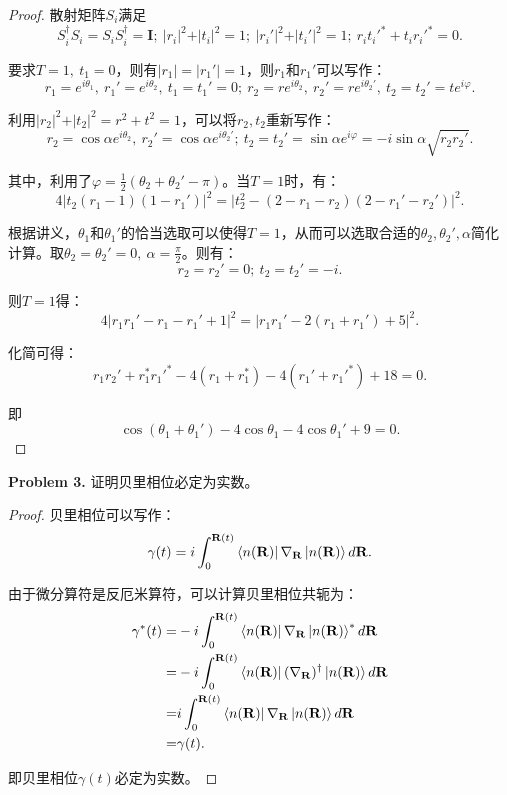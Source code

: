 \documentclass[reqno,a4paper,12pt]{amsart}
\begin{document}
\begin{proof}
散射矩阵$S_i$满足
\[
	S_i^\dagger S_i = S_i S_i^\dagger = \mathbf{I}; \ \vert r_i \vert^2 + \vert t_i \vert^2 = 1; \ \vert r_i' \vert^2 + \vert t_i' \vert^2 = 1; \ r_it_i'^* + t_ir_i'^* = 0.
\]

要求$T=1, \ t_1=0$，则有$\vert r_1 \vert = \vert r_1' \vert = 1$，则$r_1$和$r_1'$可以写作：
\[
	r_1 = e^{i\theta_1}, \ r_1' = e^{i\theta_2}, \ t_1 = t_1' = 0; \ r_2 = r e^{i\theta_2}, \ r_2' = r e^{i\theta_2'}, \ t_2 = t_2' = t e^{i\varphi}.
\]

利用$\vert r_2 \vert^2 + \vert t_2 \vert^2 = r^2 + t^2 = 1$，可以将$r_2, t_2$重新写作：
\[
	r_2 = \cos\alpha e^{i\theta_2}, \ r_2' = \cos\alpha e^{i\theta_2'}; \ t_2 = t_2' = \sin\alpha e^{i\varphi} = -i\sin\alpha \sqrt{r_2r_2'}.
\]

其中，利用了$\varphi = \frac{1}{2}(\theta_2 + \theta_2' - \pi)$。当$T = 1$时，有：
\[
	4\vert t_2(r_1-1)(1-r_1') \vert^2 = \vert t_2^2 - (2-r_1-r_2)(2-r_1'-r_2') \vert^2.
\]

根据讲义，$\theta_1$和$\theta_1'$的恰当选取可以使得$T=1$，从而可以选取合适的$\theta_2, \theta_2', \alpha$简化计算。取$\theta_2 = \theta_2' = 0,\ \alpha = \frac{\pi}{2}$。则有：
\[
	r_2 = r_2' = 0; \ t_2 = t_2' = -i.
\]

则$T=1$得：
\[
	4\vert r_1r_1' - r_1 - r_1' + 1 \vert^2 = \vert r_1r_1' - 2(r_1+r_1') + 5 \vert^2.
\]

化简可得：
\[
	r_1r_2' + r_1^*r_1'^* - 4(r_1+r_1^*) - 4(r_1'+r_1'^*) + 18 = 0.
\]

即
\[
	\cos(\theta_1+\theta_1') - 4\cos\theta_1 - 4\cos\theta_1' + 9 = 0.
\]
\end{proof}


\textbf{Problem 3.} 证明贝里相位必定为实数。

\begin{proof}
贝里相位可以写作：
\[
	\gamma(t) = i\int_0^{\mathbf{R}(t)} \bra{n(\mathbf{R})} \nabla_{\mathbf{R}} \ket{n(\mathbf{R})} d\mathbf{R}.
\]

由于微分算符是反厄米算符，可以计算贝里相位共轭为：
\begin{align*}
	\gamma^*(t) =& -i\int_0^{\mathbf{R}(t)}\bra{n(\mathbf{R})} \nabla_{\mathbf{R}} \ket{n(\mathbf{R})}^* d\mathbf{R} \\
	=& -i\int_0^{\mathbf{R}(t)}\bra{n(\mathbf{R})} (\nabla_{\mathbf{R}} )^\dagger \ket{n(\mathbf{R})} d\mathbf{R} \\
	=&i\int_0^{\mathbf{R}(t)}\bra{n(\mathbf{R})} \nabla_{\mathbf{R}} \ket{n(\mathbf{R})} d\mathbf{R} \\
	=& \gamma(t).
\end{align*}

即贝里相位$\gamma(t)$必定为实数。
\end{proof}
\end{document}
